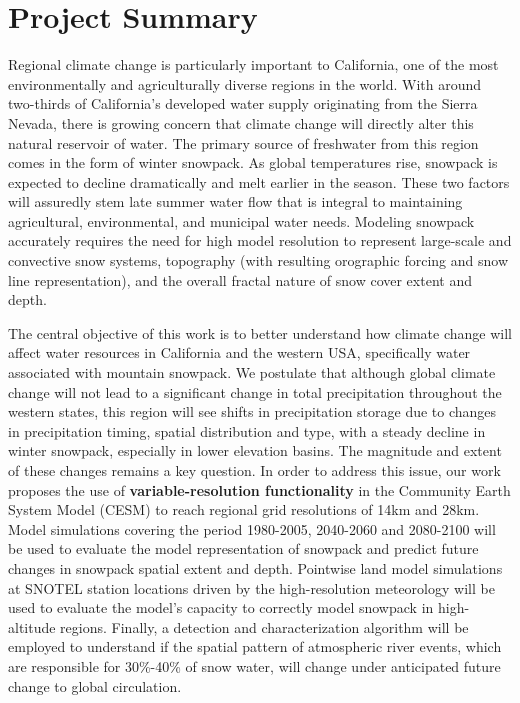 \documentclass[11pt]{article}
\begin{document}
\appendix

\addtocounter{section}{1}

\section{Project Summary}
\vspace{-0.2cm}

Regional climate change is particularly important to California, one of the most environmentally and agriculturally diverse regions in the world. With around two-thirds of California's developed water supply originating from the Sierra Nevada, there is growing concern that climate change will directly alter this natural reservoir of water.  The primary source of freshwater from this region comes in the form of winter snowpack.  As global temperatures rise, snowpack is expected to decline dramatically and melt earlier in the season.  These two factors will assuredly stem late summer water flow that is integral to maintaining agricultural, environmental, and municipal water needs.  Modeling snowpack accurately requires the need for high model resolution to represent large-scale and convective snow systems, topography (with resulting orographic forcing and snow line representation), and the overall fractal nature of snow cover extent and depth.

The central objective of this work is to better understand how climate change will affect water resources in California and the western USA, specifically water associated with mountain snowpack.  We postulate that although global climate change will not lead to a significant change in total precipitation throughout the western states, this region will see shifts in precipitation storage due to changes in precipitation timing, spatial distribution and type, with a steady decline in winter snowpack, especially in lower elevation basins.  The magnitude and extent of these changes remains a key question.  In order to address this issue, our work proposes the use of \textbf{variable-resolution functionality} in the Community Earth System Model (CESM) to reach regional grid resolutions of 14km and 28km.  Model simulations covering the period 1980-2005, 2040-2060 and 2080-2100 will be used to evaluate the model representation of snowpack and predict future changes in snowpack spatial extent and depth.  Pointwise land model simulations at SNOTEL station locations driven by the high-resolution meteorology will be used to evaluate the model's capacity to correctly model snowpack in high-altitude regions.  Finally, a detection and characterization algorithm will be employed to understand if the spatial pattern of atmospheric river events, which are responsible for 30\%-40\% of snow water, will change under anticipated future change to global circulation.
\end{document}
